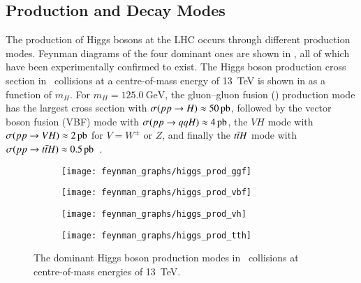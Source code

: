 \subsection{Production and Decay Modes}

The production of Higgs bosons at the LHC occurs through different production
modes. Feynman diagrams of the four dominant ones are shown in
, all of which have been experimentally confirmed to
exist. The Higgs boson production cross section in \pp~collisions at a
centre-of-mass energy of \SI{13}{\TeV} is shown in  as
a function of $m_{H}$. For $m_{H} = \SI{125.0}{\GeV}$, the gluon--gluon fusion
(\ggF) production mode has the largest cross section with
$\sigma(\pp \to H) \approx \SI{50}{\pico\barn}$, followed by the vector
boson fusion (VBF) mode with $\sigma(\pp \to qqH) \approx \SI{4}{\pico\barn}$,
the $VH$ mode with $\sigma(\pp \to VH) \approx \SI{2}{\pico\barn}$ for
$V = W^\pm$ or $Z$, and finally the $t\bar{t} H$ mode with
$\sigma(\pp \to \ttbar H) \approx
\SI{0.5}{\pico\barn}$~\cite{deFlorian:2016spz_book}.

\begin{figure}[htbp]
  \centering

  \begin{subfigure}{0.48\textwidth}
    \centering
    \texttt{[image: feynman\_graphs/higgs\_prod\_ggf]}
  \end{subfigure}%
  \begin{subfigure}{0.48\textwidth}
    \centering
    \texttt{[image: feynman\_graphs/higgs\_prod\_vbf]}
  \end{subfigure}

  \vspace*{0.5em}

  \begin{subfigure}{0.48\textwidth}
    \centering
    \texttt{[image: feynman\_graphs/higgs\_prod\_vh]}
  \end{subfigure}%
  \begin{subfigure}{0.48\textwidth}
    \centering
    \texttt{[image: feynman\_graphs/higgs\_prod\_tth]}
  \end{subfigure}%

  \caption[Higgs boson production modes in \pp~collisions.]{The dominant Higgs
    boson production modes in \pp~collisions at centre-of-mass energies of
    \SI{13}{\TeV}.}%
  \label{fig:higgs_prod_feyn}
\end{figure}

